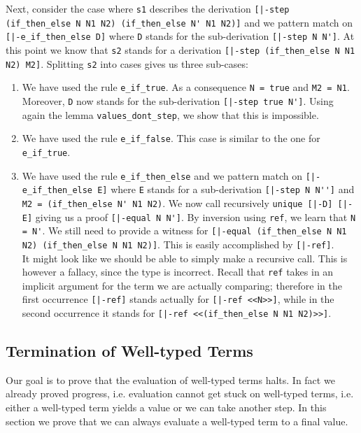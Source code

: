 Next, consider the case where \lstinline!s1! describes the derivation
\lstinline![|-step (if_then_else N N1 N2) (if_then_else N' N1 N2)]! and we pattern match on
\lstinline![|-e_if_then_else D]! where \lstinline!D! stands for the sub-derivation
\lstinline![|-step N N']!. At this point we know that \lstinline!s2! stands
for a derivation \lstinline![|-step (if_then_else N N1 N2) M2]!. Splitting
\lstinline!s2! into cases gives us three sub-cases:

\begin{enumerate}
\item We have used the rule \lstinline!e_if_true!. As a consequence
  \lstinline!N = true! and \lstinline!M2 = N1!. Moreover,
  \lstinline!D! now stands for the sub-derivation \lstinline![|-step true N']!.
  Using again the lemma \lstinline!values_dont_step!, we show that this is impossible.
\item We have used the rule \lstinline!e_if_false!. This case is similar to
  the one for \lstinline!e_if_true!.
\item We have used the rule \lstinline!e_if_then_else! and we pattern match on
\lstinline![|-e_if_then_else E]! where \lstinline!E! stands for a sub-derivation
\lstinline![|-step N N'']! and \lstinline!M2 = (if_then_else N' N1 N2)!.
We now call recursively \lstinline!unique [|-D] [|-E]! giving us a proof
\lstinline![|-equal N N']!. By inversion using \lstinline!ref!, we learn that
\lstinline!N = N'!. We still need to provide a witness for
\lstinline![|-equal (if_then_else N N1 N2) (if_then_else N N1 N2)]!. This is easily
accomplished by \lstinline![|-ref]!. \\[0.5em]
It might look like we should be able to simply make a recursive call. This is
however a fallacy, since the type is incorrect. Recall that \lstinline!ref!
takes in an implicit argument for the term we are actually comparing; therefore
in the first occurrence \lstinline![|-ref]! stands actually for
\lstinline![|-ref <<N>>]!, while in the second occurrence it %
stands for \lstinline![|-ref <<(if_then_else N N1 N2)>>]!.
\end{enumerate}


\subsection{Termination of Well-typed Terms}
Our goal is to prove that the evaluation of well-typed terms halts. In
fact we already proved progress, i.e. evaluation cannot get stuck on
well-typed terms, i.e. either a well-typed term yields a value or we
can take another step. In this section we prove that we can always
evaluate a well-typed term to a final value.

